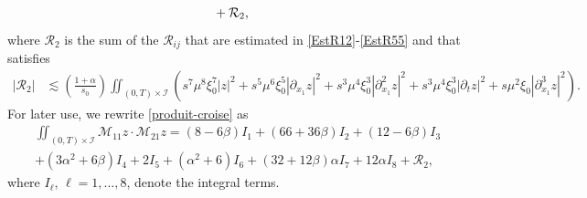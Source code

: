 \documentclass[a4paper, 12pt]{article}
\theoremstyle{plain}
\theoremstyle{definition}
\numberwithin{theorem}{section}
\numberwithin{equation}{section}
\begin{document}
{\begin{align}
&+ \mathcal{R}_2,\notag
\end{align}
where $\mathcal{R}_2$ is the sum of the $\mathcal{R}_{ij}$ that are estimated in \eqref{EstR12}-\eqref{EstR55} and that satisfies
\begin{align}\label{EstR3}
\left|\mathcal{R}_2\right|&\lesssim \left(\frac{1+\alpha}{s_0}\right)\iint_{(0,T)\times\mathcal{I}}\left(s^7\mu^8\xi^7_0|z|^2+s^5\mu^6\xi_0^5|\partial_{x_1}z|^2+s^3\mu^4\xi_0^3|\partial^2_{x_1}z|^2+s^3\mu^4\xi_0^3|\partial_tz|^2+s\mu^2\xi_0|\partial_{x_1}^3z|^2\right).
\end{align}
For later use, we rewrite \eqref{produit-croise} as 
\begin{multline} \label{produit-croise-I_l}
\iint_{(0,T)\times\mathcal{I}}\mathcal{M}_{11} z\cdot \mathcal{M}_{21} z=(8-6\beta)I_1+(66+36\beta) I_2+(12-6\beta) I_3\\
+(3\alpha^2+6\beta) I_4+2 I_5+(\alpha^2+6)I_6+(32+12\beta)\alpha I_7+ 12 \alpha I_8+\mathcal{R}_2,
\end{multline}
where $I_\ell$, $\ell = 1, \ldots ,8$, denote the integral terms.

}
\end{document}
